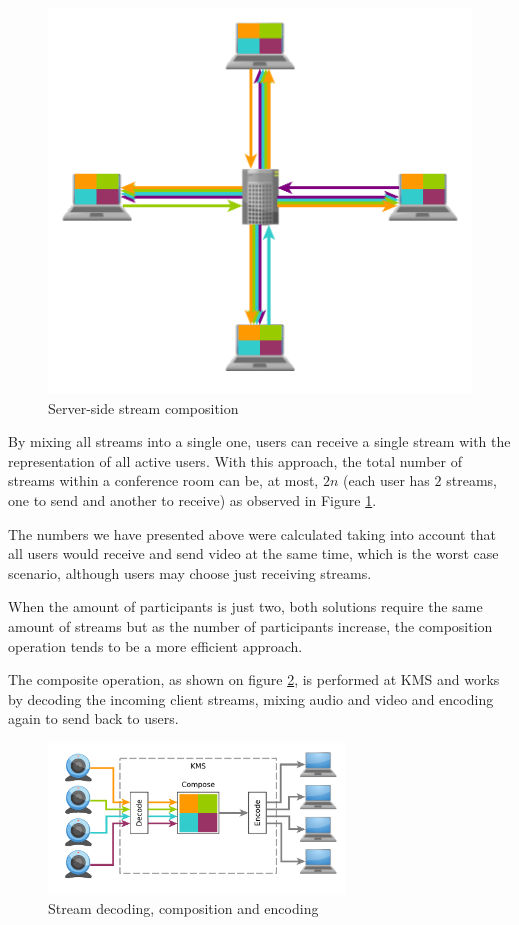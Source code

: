 \begin{figure}
\begin{minipage}[b]{0.45\linewidth}
	\includegraphics[width=\textwidth]{figures/ecomposite.pdf}
		\caption{Server-side stream composition}
	\label{fig:ecomposite}
\end{minipage}
\end{figure}


		By mixing all streams into a single one, users can receive a single stream with the representation of all active users. With this approach, the total number of streams within a conference room can be, at most, $2n$ (each user has $2$ streams, one to send and another to receive) as observed in Figure \ref{fig:ecomposite}.

		The numbers we have presented above were calculated taking into account that all users would receive and send video at the same time, which is the worst case scenario, although users may choose just receiving streams.

		When the amount of participants is just two, both solutions require the same amount of streams but as the number of participants increase, the composition operation tends to be a more efficient approach. 

		The composite operation, as shown on figure \ref{fig:wcomposite}, is performed at \ac{KMS} and works by decoding the incoming client streams, mixing audio and video and encoding again to send back to users.

	\begin{figure}
		\centering
		\includegraphics[width=0.7\textwidth]{figures/wcomposite.pdf}
		\caption{Stream decoding, composition and encoding}
		\label{fig:wcomposite}
	\end{figure}


